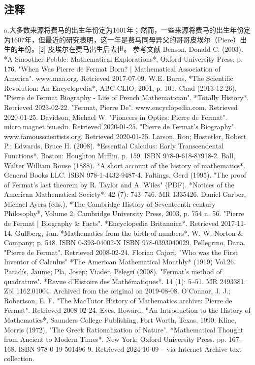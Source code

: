 \subsection{注释}  
a.大多数来源将费马的出生年份定为1601年；然而，一些来源将费马的出生年份定为1607年，但最近的研究表明，这一年是费马同母异父的哥哥皮埃尔（Piere）出生的年份。[2] 皮埃尔在费马出生后去世。
参考文献  
Benson, Donald C. (2003). *A Smoother Pebble: Mathematical Explorations*, Oxford University Press, p. 176.  
"When Was Pierre de Fermat Born? | Mathematical Association of America". www.maa.org. Retrieved 2017-07-09.  
W.E. Burns, *The Scientific Revolution: An Encyclopedia*, ABC-CLIO, 2001, p. 101.  
Chad (2013-12-26). "Pierre de Fermat Biography - Life of French Mathematician". *Totally History*. Retrieved 2023-02-22.  
"Fermat, Pierre De". www.encyclopedia.com. Retrieved 2020-01-25.  
Davidson, Michael W. "Pioneers in Optics: Pierre de Fermat". micro.magnet.fsu.edu. Retrieved 2020-01-25.  
"Pierre de Fermat's Biography". www.famousscientists.org. Retrieved 2020-01-25.  
Larson, Ron; Hostetler, Robert P.; Edwards, Bruce H. (2008). *Essential Calculus: Early Transcendental Functions*. Boston: Houghton Mifflin. p. 159. ISBN 978-0-618-87918-2.  
Ball, Walter William Rouse (1888). *A short account of the history of mathematics*. General Books LLC. ISBN 978-1-4432-9487-4.  
Faltings, Gerd (1995). "The proof of Fermat's last theorem by R. Taylor and A. Wiles" (PDF). *Notices of the American Mathematical Society*. 42 (7): 743–746. MR 1335426.  
Daniel Garber, Michael Ayers (eds.), *The Cambridge History of Seventeenth-century Philosophy*, Volume 2, Cambridge University Press, 2003, p. 754 n. 56.  
"Pierre de Fermat | Biography & Facts". *Encyclopedia Britannica*. Retrieved 2017-11-14.  
Gullberg, Jan. *Mathematics from the birth of numbers*, W. W. Norton & Company; p. 548. ISBN 0-393-04002-X ISBN 978-0393040029.  
Pellegrino, Dana. "Pierre de Fermat". Retrieved 2008-02-24.  
Florian Cajori, "Who was the First Inventor of Calculus" *The American Mathematical Monthly* (1919) Vol.26.  
Paradís, Jaume; Pla, Josep; Viader, Pelegrí (2008). "Fermat's method of quadrature". *Revue d'Histoire des Mathématiques*. 14 (1): 5–51. MR 2493381. Zbl 1162.01004. Archived from the original on 2019-08-08.  
O'Connor, J. J.; Robertson, E. F. "The MacTutor History of Mathematics archive: Pierre de Fermat". Retrieved 2008-02-24.  
Eves, Howard. *An Introduction to the History of Mathematics*, Saunders College Publishing, Fort Worth, Texas, 1990.  
Kline, Morris (1972). "The Greek Rationalization of Nature". *Mathematical Thought from Ancient to Modern Times*. New York: Oxford University Press. pp. 167–168. ISBN 978-0-19-501496-9. Retrieved 2024-10-09 – via Internet Archive text collection.  

